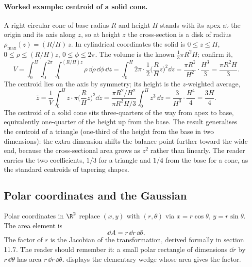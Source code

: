 \paragraph{Worked example: centroid of a solid cone.} A right
circular cone of base radius $R$ and height $H$ stands with its apex
at the origin and its axis along $z$, so at height $z$ the
cross-section is a disk of radius $\rho_{\max}(z) = (R/H)\,z$. In
cylindrical coordinates the solid is $0 \leq z \leq H$, $0 \leq
\rho \leq (R/H)z$, $0 \leq \phi \leq 2\pi$. The volume is the known
$\tfrac{1}{3}\pi R^{2} H$; confirm it,
\[
V = \int_{0}^{H}\!\int_{0}^{2\pi}\!\int_{0}^{(R/H)z}
\rho\,\dd\rho\,\dd\phi\,\dd z
= \int_{0}^{H} 2\pi\cdot\frac{1}{2}\Big(\frac{R}{H}z\Big)^{2}\dd z
= \frac{\pi R^{2}}{H^{2}}\cdot\frac{H^{3}}{3}
= \frac{\pi R^{2} H}{3}.
\]
The centroid lies on the axis by symmetry; its height is the
$z$-weighted average,
\[
\bar{z} = \frac{1}{V}\int_{0}^{H} z\cdot\pi\Big(\frac{R}{H}z\Big)^{2}
\dd z = \frac{\pi R^{2}/H^{2}}{\pi R^{2} H/3}\int_{0}^{H} z^{3}\,\dd z
= \frac{3}{H^{3}}\cdot\frac{H^{4}}{4} = \frac{3 H}{4}.
\]
The centroid of a solid cone sits three-quarters of the way from
apex to base, equivalently one-quarter of the height up from the
base. The result generalises the centroid of a triangle (one-third
of the height from the base in two dimensions): the extra dimension
shifts the balance point further toward the wide end, because the
cross-sectional area grows as $z^{2}$ rather than linearly. The
reader carries the two coefficients, $1/3$ for a triangle and $1/4$
from the base for a cone, as the standard centroids of tapering
shapes.

\subsection{Polar coordinates and the Gaussian}

Polar coordinates in $\R^{2}$ replace $(x, y)$ with $(r, \theta)$ via
$x = r\cos\theta$, $y = r\sin\theta$. The area element is
\[
\dd A = r \,\dd r\,\dd\theta.
\]
The factor of $r$ is the Jacobian of the transformation, derived
formally in section 11.7. The reader should remember it: a small
polar rectangle of dimensions $\dd r$ by $r\,\dd\theta$ has area
$r\,\dd r\,\dd\theta$. 
displays the elementary wedge whose area gives the factor.



